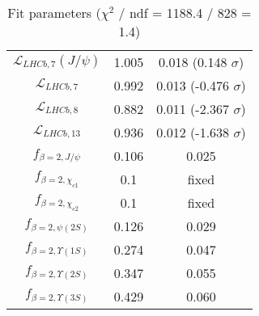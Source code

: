 \begin{table}[h!]
\begin{tabular}{c|c|c}
$\mathcal L_{LHCb,7}(J/\psi)$ & 1.005 & 0.018 (0.148 $\sigma$) \\
$\mathcal L_{LHCb,7}$ & 0.992 & 0.013 (-0.476 $\sigma$) \\
$\mathcal L_{LHCb,8}$ & 0.882 & 0.011 (-2.367 $\sigma$) \\
$\mathcal L_{LHCb,13}$ & 0.936 & 0.012 (-1.638 $\sigma$) \\
$f_{\beta=2,J/\psi}$ & 0.106 & 0.025 \\
$f_{\beta=2,\chi_{c1}}$ & 0.1 & fixed \\
$f_{\beta=2,\chi_{c2}}$ & 0.1 & fixed \\
$f_{\beta=2,\psi(2S)}$ & 0.126 & 0.029 \\
$f_{\beta=2,\Upsilon(1S)}$ & 0.274 & 0.047 \\
$f_{\beta=2,\Upsilon(2S)}$ & 0.347 & 0.055 \\
$f_{\beta=2,\Upsilon(3S)}$ & 0.429 & 0.060 \\
\end{tabular}
\caption{Fit parameters ($\chi^2$ / ndf = 1188.4 / 828 = 1.4)}
\end{table}
